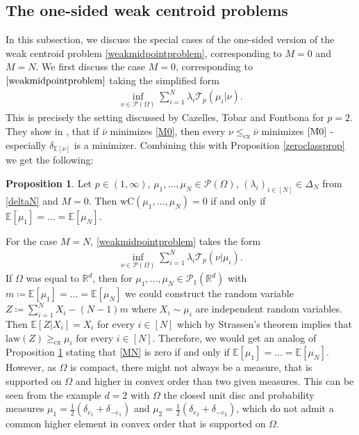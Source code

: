 \documentclass[letterpaper]{amsart}
\newcommand{\RR}{\mathbb{R}}
\newcommand{\EE}{\mathbb{E}}
\theoremstyle{definition}
\newtheorem{prop}[thm]{Proposition}
\begin{document}
\subsection{The one-sided weak centroid problems}
In this subsection, we discuss the special cases of the one-sided version of the weak centroid problem \eqref{weakmidpointproblem}, corresponding to $M=0$ and $M=N$.
We first discuss the case $M=0$, corresponding to $\eqref{weakmidpointproblem}$ taking the simplified form
\begin{gather}\label{M0}
	\inf_{\nu\in\mathcal P(\Omega)}\sum_{i=1}^N \lambda_i \mathcal T_p(\mu_i|\nu).
\end{gather}
This is precisely the setting discussed by Cazelles, Tobar and Fontbona \cite{cazelles2021} for $p=2$. They show in \cite[Lma 1]{cazelles2021}, that if $\bar\nu$ minimizes \eqref{M0}, then every $\nu\leq_{\text{cx}}\bar\nu$ minimizes $\eqref{M0}$ - especially $\delta_{\EE[\bar\nu]}$ is a minimizer. Combining this with Proposition \ref{zeroclassprop} we get the following:
\begin{prop}\label{M0zeroclassprop}
	Let $p\in(1,\infty)$, $\mu_1,\dots,\mu_N\in\mathcal P(\Omega)$, $(\lambda_i)_{i\in[N]}\in\Delta_N$ from \eqref{deltaN} and $M=0$. Then $\text{wC}(\mu_1,\dots,\mu_N)=0$ if and only if $\EE[\mu_1]=\dots=\EE[\mu_N]$.
\end{prop}
For the case $M=N$, \eqref{weakmidpointproblem} takes the form
\begin{gather}\label{MN}
	\inf_{\nu\in\mathcal P(\Omega)}\sum_{i=1}^N\lambda_i\mathcal T_p(\nu|\mu_i).
\end{gather}
If $\Omega$ was equal to $\RR^d$, then for $\mu_1,\dots,\mu_N\in\mathcal P_1(\RR^d)$ with $m\coloneqq\EE[\mu_1]=\dots=\EE[\mu_N]$ we could construct the random variable $Z\coloneqq\sum_{i=1}^NX_i-(N-1)m$ where $X_i\sim\mu_i$ are independent random variables. Then $\EE[Z|X_i]=X_i$ for every $i\in[N]$ which by Strassen's theorem implies that $\text{law}(Z)\geq_{\text{cx}}\mu_i$ for every $i\in[N]$. Therefore, we would get an analog of Proposition \ref{M0zeroclassprop} stating that \eqref{MN} is zero if and only if $\EE[\mu_1]=\dots=\EE[\mu_N]$.\\
However, as $\Omega$ is compact, there might not always be a measure, that is supported on $\Omega$ and higher in convex order than two given measures. This can be seen from the example $d=2$ with $\Omega$ the closed unit disc and probability measures $\mu_1=\frac{1}{2}(\delta_{e_1}+\delta_{-e_1})$ and $\mu_2=\frac{1}{2}(\delta_{e_2}+\delta_{-e_2})$, which do not admit a common higher element in convex order that is supported on $\Omega$.
\end{document}
